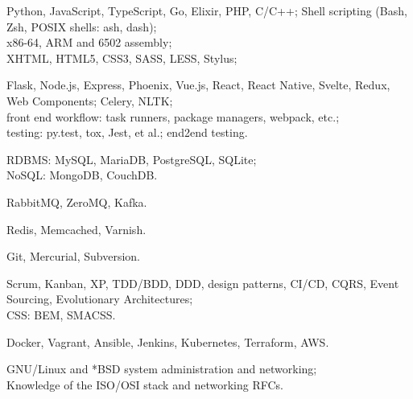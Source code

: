 \documentclass{resume}
\begin{document}
\begin{skillssection}
        {Python, JavaScript, TypeScript, Go, Elixir, PHP, C/C++; Shell
            scripting (Bash, Zsh, POSIX shells: ash, dash);\\%
            x86-64, ARM and 6502 assembly;\\%
            XHTML, HTML5, CSS3, SASS, LESS, Stylus;}

        {Flask, Node.js, Express, Phoenix, Vue.js, React, React Native, Svelte,
            Redux, Web Components; Celery, NLTK;\\%
            front end workflow: task runners, package managers, webpack,
            etc.;\\%
            testing: py.test, tox, Jest, et al.; end2end testing.}

        {RDBMS: MySQL, MariaDB, PostgreSQL, SQLite;\\%
            NoSQL: MongoDB, CouchDB.}

        {RabbitMQ, ZeroMQ, Kafka.}

        {Redis, Memcached, Varnish.}

        {Git, Mercurial, Subversion.}

        {Scrum, Kanban, XP, TDD/BDD, DDD, design patterns, CI/CD, CQRS, Event
            Sourcing, Evolutionary Architectures;\\%
            CSS: BEM, SMACSS.}

        {Docker, Vagrant, Ansible, Jenkins, Kubernetes, Terraform, AWS.}

        {GNU/Linux and *BSD system administration and networking;\\%
            Knowledge of the ISO/OSI stack and networking RFCs.}
\end{skillssection}
\end{document}
